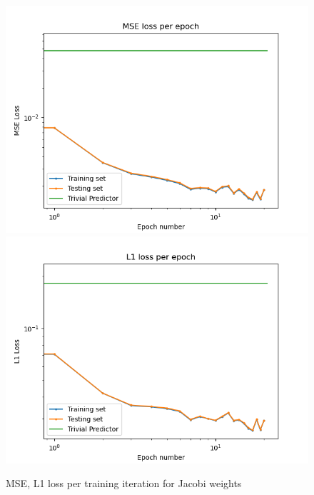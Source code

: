 \begin{figure}[h]
  \centering
  \includegraphics[scale=0.7]{figures/jacobi-conv/jacobi_mse.png}
  \includegraphics[scale=0.7]{figures/jacobi-conv/jacobi_l1.png}
  \caption{MSE, L1 loss per training iteration for Jacobi weights}
  \label{fig:jacobi_loss}
\end{figure}

